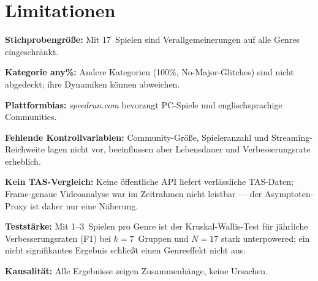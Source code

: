 \section{Limitationen}

\textbf{Stichprobengröße:} Mit 17~Spielen sind Verallgemeinerungen auf alle Genres eingeschränkt.

\textbf{Kategorie any\%:} Andere Kategorien (100\%, No-Major-Glitches) sind nicht abgedeckt; ihre Dynamiken können abweichen.

\textbf{Plattformbias:} \textit{speedrun.com} bevorzugt PC-Spiele und englischsprachige Communities.

\textbf{Fehlende Kontrollvariablen:} Community-Größe, Spieleranzahl und Streaming-Reichweite lagen nicht vor, beeinflussen aber Lebensdauer und Verbesserungsrate erheblich.

\textbf{Kein TAS-Vergleich:} Keine öffentliche API liefert verlässliche TAS-Daten; Frame-genaue Videoanalyse war im Zeitrahmen nicht leistbar --- der Asymptoten-Proxy ist daher nur eine Näherung.

\textbf{Teststärke:} Mit 1–3~Spielen pro Genre ist der Kruskal-Wallis-Test für jährliche Verbesserungsraten (F1) bei $k = 7$~Gruppen und $N = 17$ stark unterpowered; ein nicht signifikantes Ergebnis schließt einen Genreeffekt nicht aus.

\textbf{Kausalität:} Alle Ergebnisse zeigen Zusammenhänge, keine Ursachen.
